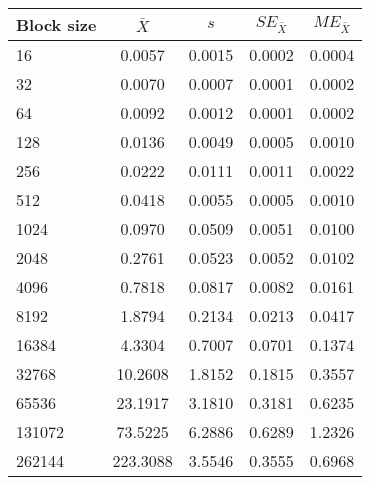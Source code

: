 \begin{tabular}{lcccc}\toprule
{\small Block size} & $\bar{X}$ & $s$ & $SE_{\bar{X}}$ & $ME_{\bar{X}}$ \\\midrule
16 & 0.0057 & 0.0015 & 0.0002 & 0.0004\\
32 & 0.0070 & 0.0007 & 0.0001 & 0.0002\\
64 & 0.0092 & 0.0012 & 0.0001 & 0.0002\\
128 & 0.0136 & 0.0049 & 0.0005 & 0.0010\\
256 & 0.0222 & 0.0111 & 0.0011 & 0.0022\\
512 & 0.0418 & 0.0055 & 0.0005 & 0.0010\\
1024 & 0.0970 & 0.0509 & 0.0051 & 0.0100\\
2048 & 0.2761 & 0.0523 & 0.0052 & 0.0102\\
4096 & 0.7818 & 0.0817 & 0.0082 & 0.0161\\
8192 & 1.8794 & 0.2134 & 0.0213 & 0.0417\\
16384 & 4.3304 & 0.7007 & 0.0701 & 0.1374\\
32768 & 10.2608 & 1.8152 & 0.1815 & 0.3557\\
65536 & 23.1917 & 3.1810 & 0.3181 & 0.6235\\
131072 & 73.5225 & 6.2886 & 0.6289 & 1.2326\\
262144 & 223.3088 & 3.5546 & 0.3555 & 0.6968\\
\bottomrule
\end{tabular}
